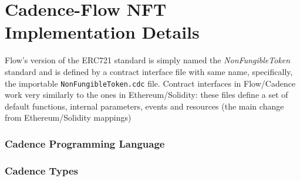 \documentclass[../main.tex]{subfiles}
\begin{document}
\section{Cadence-Flow NFT Implementation Details}
\label{sec:cadence_flow_nft_implementation}
Flow's version of the ERC721 standard is simply named the \textit{NonFungibleToken} standard and is defined by a contract interface file with same name, specifically, the importable \verb|NonFungibleToken.cdc| file. Contract interfaces in Flow/Cadence work very similarly to the ones in Ethereum/Solidity: these files define a set of default functions, internal parameters, events and resources (the main change from Ethereum/Solidity mappings)

\subsubsection{Cadence Programming Language}


\subsubsection{Cadence Types}

\end{document}
